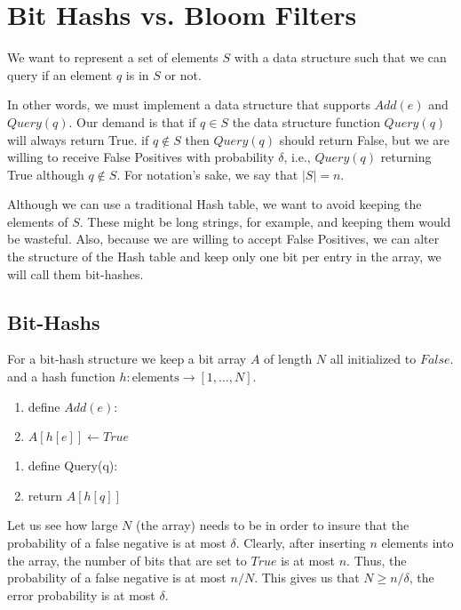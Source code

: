 \documentclass{article}
\begin{document}


\section*{Bit Hashs vs. Bloom Filters}

We want to represent a set of elements $S$ with a data structure such that
we can query if an element $q$ is in $S$ or not.

In other words, we must implement a data structure that supports $Add(e)$ and 
$Query(q)$. Our demand is that if $q\in S$ the data structure function $Query(q)$ will always return True.
if $q \not\in S$ then $Query(q)$ should return False, but we are willing to receive False Positives with probability $\delta$, i.e., $Query(q)$ returning True although $q \not\in S$.
For notation's sake, we say that $|S| = n$.

Although we can use a traditional Hash table, we want to avoid keeping the elements of $S$.
These might be long strings, for example, and keeping them would be wasteful.  
Also, because we are willing to accept False Positives, we can alter the structure of the Hash table 
and keep only one bit per entry in the array, we will call them bit-hashes.

\subsection*{Bit-Hashs}
For a bit-hash structure we keep a bit array $A$ of length $N$ all initialized to $False$.
and a hash function $h: \mbox{elements} \rightarrow [1,\ldots,N]$.

\begin{enumerate}
\item define  $Add(e)$:
\item \tab $A[h[e]] \leftarrow True$ 
\end{enumerate}


\begin{enumerate}
\item define  Query(q):
\item \tab return $A[h[q]]$ 
\end{enumerate}

Let us see how large $N$ (the array) needs to be in order to insure that the probability of a 
false negative is at most $\delta$. 
Clearly, after inserting $n$ elements into the array, the number of bits that are set to $True$ 
is at most $n$. Thus, the probability of a false negative is at most $n/N$.
This gives us that $N \ge n/\delta$, the error probability is at most $\delta$.
\end{document}
